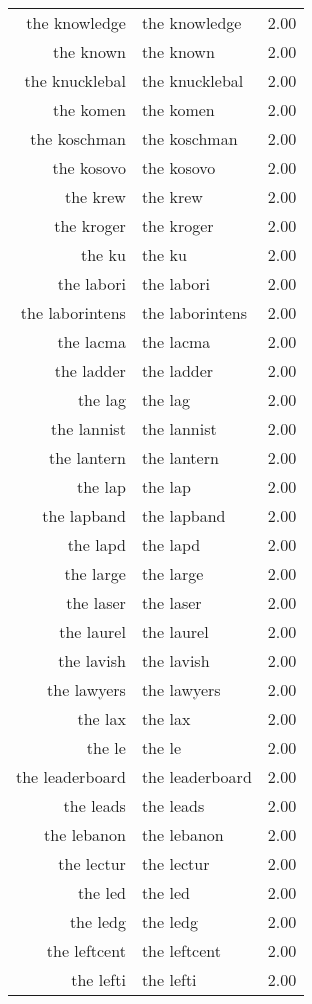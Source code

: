 \begin{table}[ht]
\begin{tabular}{rlr}
  the knowledge & the knowledge & 2.00 \\ 
  the known & the known & 2.00 \\ 
  the knucklebal & the knucklebal & 2.00 \\ 
  the komen & the komen & 2.00 \\ 
  the koschman & the koschman & 2.00 \\ 
  the kosovo & the kosovo & 2.00 \\ 
  the krew & the krew & 2.00 \\ 
  the kroger & the kroger & 2.00 \\ 
  the ku & the ku & 2.00 \\ 
  the labori & the labori & 2.00 \\ 
  the laborintens & the laborintens & 2.00 \\ 
  the lacma & the lacma & 2.00 \\ 
  the ladder & the ladder & 2.00 \\ 
  the lag & the lag & 2.00 \\ 
  the lannist & the lannist & 2.00 \\ 
  the lantern & the lantern & 2.00 \\ 
  the lap & the lap & 2.00 \\ 
  the lapband & the lapband & 2.00 \\ 
  the lapd & the lapd & 2.00 \\ 
  the large & the large & 2.00 \\ 
  the laser & the laser & 2.00 \\ 
  the laurel & the laurel & 2.00 \\ 
  the lavish & the lavish & 2.00 \\ 
  the lawyers & the lawyers & 2.00 \\ 
  the lax & the lax & 2.00 \\ 
  the le & the le & 2.00 \\ 
  the leaderboard & the leaderboard & 2.00 \\ 
  the leads & the leads & 2.00 \\ 
  the lebanon & the lebanon & 2.00 \\ 
  the lectur & the lectur & 2.00 \\ 
  the led & the led & 2.00 \\ 
  the ledg & the ledg & 2.00 \\ 
  the leftcent & the leftcent & 2.00 \\ 
  the lefti & the lefti & 2.00 \\ 

\end{tabular}
\end{table}
